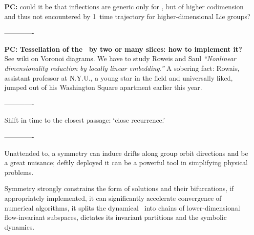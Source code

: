 {\bf PC:}{ could it be that inflections are generic only for ,
        but of higher codimension and thus not encountered
        by 1\dmn\ time trajectory for higher-dimensional Lie groups?}


-------------

{\bf PC:}{
{\bf Tessellation of the \reducedsp\ by two or many slices:
how to implement it?}
See 
{wiki on Voronoi diagrams}.
We have to study Roweis  and Saul
\emph{``Nonlinear dimensionality reduction by locally linear embedding.''}
A sobering fact: Rowais, assistant professor at N.Y.U., a young
star in the field and universally liked, jumped out of his Washington
Square apartment earlier this year.
	}


%

-------------

Shift in time to the closest passage:
`close recurrence.'

-------------

Unattended to, a symmetry can induce drifts along group orbit directions
and be a great nuisance; deftly deployed it can be a powerful tool in
simplifying physical problems.

Symmetry strongly constrains the form of solutions and their
bifurcations, if appropriately implemented, it can significantly
accelerate convergence of numerical algorithms, it splits the dynamical
\statesp\ into chains of lower-dimensional flow-invariant subspaces,
dictates its invariant partitions and the symbolic dynamics.

